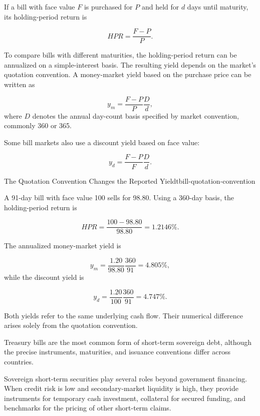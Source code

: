 If a bill with face value \(F\) is purchased for \(P\) and held for \(d\) days until maturity, its holding-period return is

\begin{equation}
HPR=\frac{F-P}{P}.
\label{eq:ch7-tbill-hpr}
\end{equation}

To compare bills with different maturities, the holding-period return can be annualized on a simple-interest basis. The resulting yield depends on the market's quotation convention. A money-market yield based on the purchase price can be written as

\begin{equation}
y_m=\frac{F-P}{P}\frac{D}{d},
\label{eq:ch7-money-market-yield}
\end{equation}
where $D$ denotes the annual day-count basis specified by market convention, commonly 360 or 365.

Some bill markets also use a discount yield based on face value:

\begin{equation}
y_d=\frac{F-P}{F}\frac{D}{d}.
\label{eq:ch7-discount-yield}
\end{equation}

\begin{example}{The Quotation Convention Changes the Reported Yield}{tbill-quotation-convention}

A 91-day bill with face value 100 sells for 98.80. Using a 360-day basis, the holding-period return is

\[
HPR=\frac{100-98.80}{98.80}=1.2146\%.
\]

The annualized money-market yield is

\[
y_m=\frac{1.20}{98.80}\frac{360}{91}=4.805\%,
\]
while the discount yield is

\[
y_d=\frac{1.20}{100}\frac{360}{91}=4.747\%.
\]

Both yields refer to the same underlying cash flow. Their numerical difference arises solely from the quotation convention.

\end{example}

Treasury bills are the most common form of short-term sovereign debt, although the precise instruments, maturities, and issuance conventions differ across countries.

Sovereign short-term securities play several roles beyond government financing. When credit risk is low and secondary-market liquidity is high, they provide instruments for temporary cash investment, collateral for secured funding, and benchmarks for the pricing of other short-term claims.

